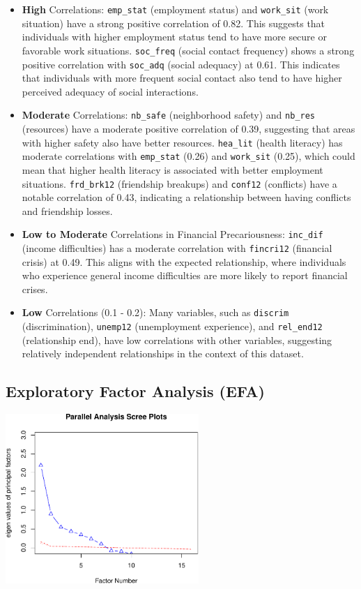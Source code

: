 \documentclass[
]{article}
\begin{document}
\begin{itemize}
\item
  \textbf{High} Correlations: \texttt{emp\_stat} (employment status) and
  \texttt{work\_sit} (work situation) have a strong positive correlation
  of 0.82. This suggests that individuals with higher employment status
  tend to have more secure or favorable work situations.
  \texttt{soc\_freq} (social contact frequency) shows a strong positive
  correlation with \texttt{soc\_adq} (social adequacy) at 0.61. This
  indicates that individuals with more frequent social contact also tend
  to have higher perceived adequacy of social interactions.
\item
  \textbf{Moderate} Correlations: \texttt{nb\_safe} (neighborhood
  safety) and \texttt{nb\_res} (resources) have a moderate positive
  correlation of 0.39, suggesting that areas with higher safety also
  have better resources. \texttt{hea\_lit} (health literacy) has
  moderate correlations with \texttt{emp\_stat} (0.26) and
  \texttt{work\_sit} (0.25), which could mean that higher health
  literacy is associated with better employment situations.
  \texttt{frd\_brk12} (friendship breakups) and \texttt{conf12}
  (conflicts) have a notable correlation of 0.43, indicating a
  relationship between having conflicts and friendship losses.
\item
  \textbf{Low to Moderate} Correlations in Financial Precariousness:
  \texttt{inc\_dif} (income difficulties) has a moderate correlation
  with \texttt{fincri12} (financial crisis) at 0.49. This aligns with
  the expected relationship, where individuals who experience general
  income difficulties are more likely to report financial crises.
\item
  \textbf{Low} Correlations (0.1 - 0.2): Many variables, such as
  \texttt{discrim} (discrimination), \texttt{unemp12} (unemployment
  experience), and \texttt{rel\_end12} (relationship end), have low
  correlations with other variables, suggesting relatively independent
  relationships in the context of this dataset.
\end{itemize}

\subsection{Exploratory Factor Analysis
(EFA)}\label{exploratory-factor-analysis-efa}

\begin{center}
\includegraphics[width=0.55\textwidth,height=\textheight]{draft_v1_files/figure-pdf/unnamed-chunk-9-1.pdf}
\end{center}
\end{document}
